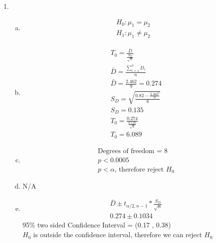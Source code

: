 \documentclass[14pt]{article}
\begin{document}
\begin{enumerate}
\begin{enumerate}[(a)]
\end{enumerate}

\item
\begin{enumerate}[(a)]
\item
\begin{align*}
H_0: \mu_1 = \mu_2 \\[15pt]
H_1: \mu_1 \neq \mu_2
\end{align*}

\item
\begin{align*}
& T_0 = \frac{\bar{D}}{\frac{S_D}{\sqrt{n}}} \\[15pt]
& \bar{D} = \frac{\sum_{i=1}^{n} D_i}{n} \\[15pt]
& \bar{D} = \frac{2.462}{9} = 0.274 \\[15pt]
& S_D = \sqrt{\frac{0.82 - \frac{2.462^2}{9}}{8}} \\[15pt]
& S_D = 0.135 \\[15pt]
& T_0 =\frac{0.274}{\frac{0.135}{\sqrt{9}}} \\[15pt]
& T_0 = 6.089
\end{align*}

\item
\begin{align*}
& \text{Degrees of freedom = } 8 \\[15pt]
& p < 0.0005 \\[15pt]
& p < \alpha \text{, therefore reject } H_0 
\end{align*}

\item
N/A

\item
\begin{align*}
& \bar{D} \pm t_{\alpha / 2, n-1} * \frac{S_D}{\sqrt{n}} \\[15pt]
& 0.274 \pm 0.1034
\end{align*}
95\% two sided Confidence Interval = (0.17 , 0.38) \\
$H_0$ is outside the confidence interval, therefore we can reject $H_0$

\end{enumerate}

\end{enumerate}
\end{document}
